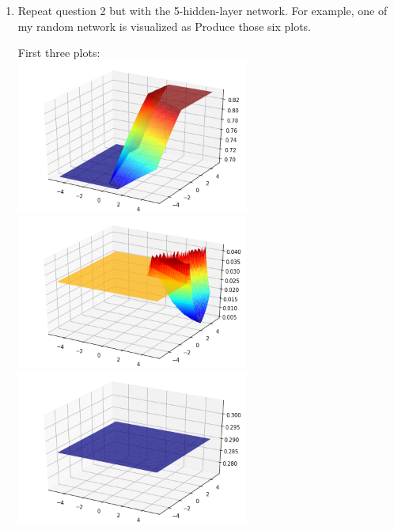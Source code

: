 \documentclass[a4paper]{article}
\theoremstyle{definition}
\newenvironment{soln}{
    \leavevmode\color{blue}\ignorespaces
}{}
\begin{document}
\begin{enumerate}
\item Repeat question 2 but with the 5-hidden-layer network.
For example, one of my random network is visualized as
Produce those six plots.
\begin{soln}
First three plots:\\
\includegraphics[width=3in]{Q14_0.png}
\includegraphics[width=3in]{Q14_1.png}\\
\includegraphics[width=3in]{Q14_2.png}\\


\end{soln}
\end{enumerate}
\end{document}
